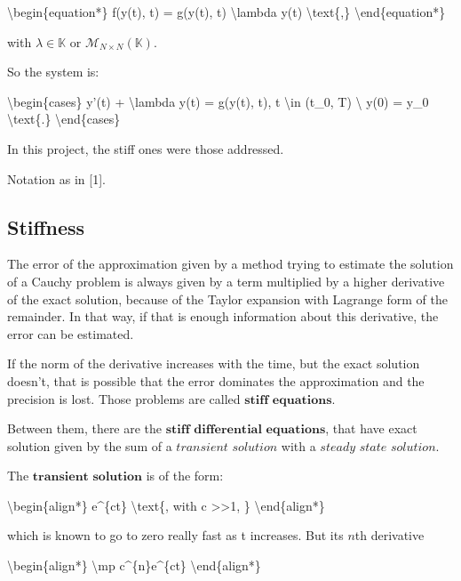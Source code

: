 \documentclass[letterpaper,10pt,english]{jupyterBook}
\begin{document}
\sphinxAtStartPar
\textbackslash{}begin\{equation*\}
f(y(t), t) = g(y(t), t) \sphinxhyphen{} \textbackslash{}lambda y(t) \textbackslash{}text\{,\}
\textbackslash{}end\{equation*\}

\sphinxAtStartPar
with \(\lambda \in \mathbb{K}\) or \(\mathscr{M}_{N \times N}(\mathbb{K})\).

\sphinxAtStartPar
So the system is:

\sphinxAtStartPar
\textbackslash{}begin\{cases\}
y’(t) + \textbackslash{}lambda y(t) = g(y(t), t), t \textbackslash{}in (t\_0, T) \textbackslash{}
y(0) = y\_0
\textbackslash{}text\{.\}
\textbackslash{}end\{cases\}

\sphinxAtStartPar
In this project, the stiff ones were those addressed.

\sphinxAtStartPar
Notation as in {[}1{]}.


\subsection{Stiffness}
\label{\detokenize{cap1:stiffness}}
\sphinxAtStartPar
The error of the approximation given by a method trying to estimate the solution of a Cauchy problem is always given by a term multiplied by a higher derivative of the exact solution, because of the Taylor expansion with Lagrange form of the remainder. In that way, if that is enough information about this derivative, the error can be estimated.

\sphinxAtStartPar
If the norm of the derivative increases with the time, but the exact solution doesn’t, that is possible that the error dominates the approximation and the precision is lost. Those problems are called \(\textbf{stiff equations}\).

\sphinxAtStartPar
Between them, there are the \(\textbf{stiff differential equations}\), that have exact solution given by the sum of a \(\textit{transient solution}\) with a \(\textit{steady state solution}\).

\sphinxAtStartPar
The \(\textbf{transient solution}\) is of the form:

\sphinxAtStartPar
\textbackslash{}begin\{align*\}
e\textasciicircum{}\{\sphinxhyphen{}ct\} \textbackslash{}text\{, with c >>1, \}
\textbackslash{}end\{align*\}

\sphinxAtStartPar
which is known to go to zero really fast as t increases. But its \(n\)th derivative

\sphinxAtStartPar
\textbackslash{}begin\{align*\}
\textbackslash{}mp c\textasciicircum{}\{n\}e\textasciicircum{}\{\sphinxhyphen{}ct\}
\textbackslash{}end\{align*\}
\end{document}
